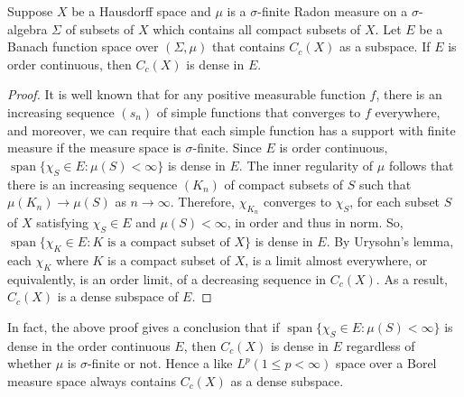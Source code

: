 \begin{theorem}
	Suppose $X$ be a Hausdorff space and $\mu$ is a $\sigma$-finite Radon measure on a $\sigma$-algebra $\Sigma$ of subsets of $X$ which contains all compact subsets of $X$.  Let $E$ be a Banach function space over $(\Sigma,\mu)$ that contains $C_c(X)$ as a subspace. If $E$ is order continuous, then $C_c(X)$ is dense in $E$.
\end{theorem}
\begin{proof}
It is well known that for any positive measurable function $f$, there is an increasing sequence $(s_n)$ of simple functions that converges to $f$ everywhere,  and moreover, we can require that each simple function has a support with finite measure if the measure space is $\sigma$-finite.
Since $E$ is order continuous, $\operatorname{span}\{\chi_S\in E:\mu(S)<\infty\}$ is dense in $E$. The inner regularity of $\mu$ follows that there is an increasing sequence $(K_n)$ of compact subsets of $S$ such that $\mu(K_n)\to \mu(S)$  as $n\to  \infty$. Therefore, $\chi_{K_n}$ converges to $\chi_S$, for each subset $S$ of $X$ satisfying $\chi_S\in E$ and $\mu(S)<\infty$, in order and thus in norm. So, $\operatorname{span}\{\chi_K\in E:K\mbox{ is a compact subset of } X\}$ is dense in $E$. By Urysohn's lemma, each $\chi_K$ where $K$ is a compact subset of $X$, is a limit almost everywhere, or equivalently, is an order limit, of a decreasing sequence in $C_c(X)$. As a result, $C_c(X)$ is a dense subspace of $E$.
\end{proof}
\begin{remark}
In fact, the above proof gives a conclusion that if $\operatorname{span}\{\chi_S\in E:\mu(S)<\infty\}$ is dense in the order continuous \bfs $E$, then $C_c(X)$ is dense in $E$ regardless of whether $\mu$ is $\sigma$-finite or not. Hence a \bfs like $L^p(1\leq p<\infty)$ space over a Borel measure space always contains $C_c(X)$ as a dense subspace. 
\end{remark}

